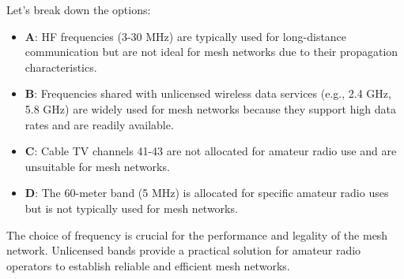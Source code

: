 \noindent Let's break down the options:
\begin{itemize}
    \item \textbf{A}: HF frequencies (3-30 MHz) are typically used for long-distance communication but are not ideal for mesh networks due to their propagation characteristics.
    \item \textbf{B}: Frequencies shared with unlicensed wireless data services (e.g., 2.4 GHz, 5.8 GHz) are widely used for mesh networks because they support high data rates and are readily available.
    \item \textbf{C}: Cable TV channels 41-43 are not allocated for amateur radio use and are unsuitable for mesh networks.
    \item \textbf{D}: The 60-meter band (5 MHz) is allocated for specific amateur radio uses but is not typically used for mesh networks.
\end{itemize}

\noindent The choice of frequency is crucial for the performance and legality of the mesh network. Unlicensed bands provide a practical solution for amateur radio operators to establish reliable and efficient mesh networks.

